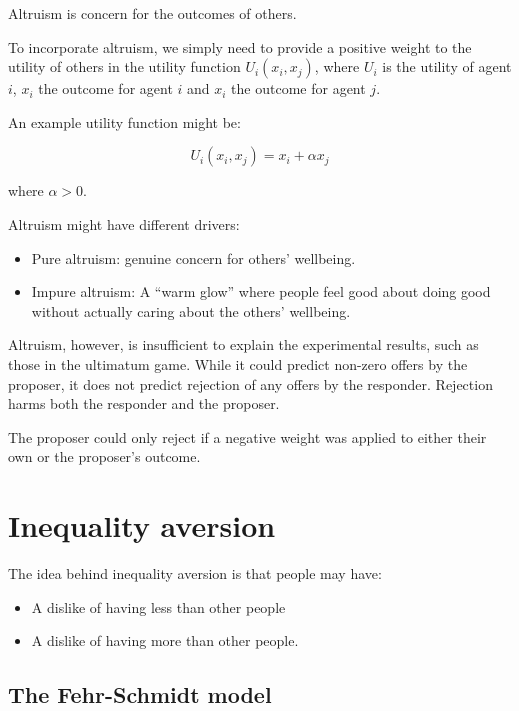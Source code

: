 \documentclass[
  letterpaper,
  DIV=11,
  numbers=noendperiod]{scrreprt}
\begin{document}
Altruism is concern for the outcomes of others.

To incorporate altruism, we simply need to provide a positive weight to
the utility of others in the utility function \(U_i(x_i,x_j)\), where
\(U_i\) is the utility of agent \(i\), \(x_i\) the outcome for agent
\(i\) and \(x_i\) the outcome for agent \(j\).

An example utility function might be:

\[
U_i(x_i,x_j)=x_i+\alpha x_j
\]

where \(\alpha>0\).

Altruism might have different drivers:

\begin{itemize}
\item
  Pure altruism: genuine concern for others' wellbeing.
\item
  Impure altruism: A ``warm glow'' where people feel good about doing
  good without actually caring about the others' wellbeing.
\end{itemize}

Altruism, however, is insufficient to explain the experimental results,
such as those in the ultimatum game. While it could predict non-zero
offers by the proposer, it does not predict rejection of any offers by
the responder. Rejection harms both the responder and the proposer.

The proposer could only reject if a negative weight was applied to
either their own or the proposer's outcome.

\hypertarget{inequality-aversion}{%
\section{Inequality aversion}\label{inequality-aversion}}

The idea behind inequality aversion is that people may have:

\begin{itemize}
\item
  A dislike of having less than other people
\item
  A dislike of having more than other people.
\end{itemize}

\hypertarget{the-fehr-schmidt-model}{%
\subsection{The Fehr-Schmidt model}\label{the-fehr-schmidt-model}}
\end{document}
